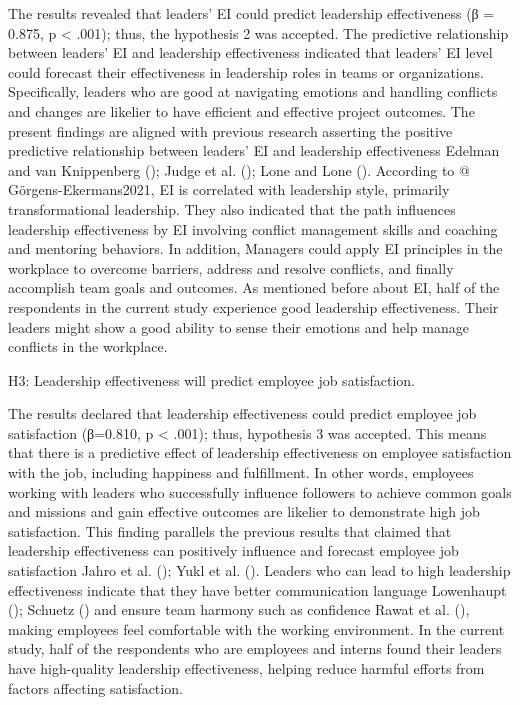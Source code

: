 \documentclass[
  man,
  longtable,
  nolmodern,
  notxfonts,
  notimes,
  colorlinks=true,linkcolor=blue,citecolor=blue,urlcolor=blue]{apa7}
\begin{document}
The results revealed that leaders' EI could predict leadership
effectiveness (β = 0.875, p \textless{} .001); thus, the hypothesis 2
was accepted. The predictive relationship between leaders' EI and
leadership effectiveness indicated that leaders' EI level could forecast
their effectiveness in leadership roles in teams or organizations.
Specifically, leaders who are good at navigating emotions and handling
conflicts and changes are likelier to have efficient and effective
project outcomes. The present findings are aligned with previous
research asserting the positive predictive relationship between leaders'
EI and leadership effectiveness Edelman and van Knippenberg
(); Judge et al.
(); Lone and Lone
(). According to @ Görgens-Ekermans2021, EI
is correlated with leadership style, primarily transformational
leadership. They also indicated that the path influences leadership
effectiveness by EI involving conflict management skills and coaching
and mentoring behaviors. In addition, Managers could apply EI principles
in the workplace to overcome barriers, address and resolve conflicts,
and finally accomplish team goals and outcomes. As mentioned before
about EI, half of the respondents in the current study experience good
leadership effectiveness. Their leaders might show a good ability to
sense their emotions and help manage conflicts in the workplace.

H3: Leadership effectiveness will predict employee job satisfaction.

The results declared that leadership effectiveness could predict
employee job satisfaction (β=0.810, p \textless{} .001); thus,
hypothesis 3 was accepted. This means that there is a predictive effect
of leadership effectiveness on employee satisfaction with the job,
including happiness and fulfillment. In other words, employees working
with leaders who successfully influence followers to achieve common
goals and missions and gain effective outcomes are likelier to
demonstrate high job satisfaction. This finding parallels the previous
results that claimed that leadership effectiveness can positively
influence and forecast employee job satisfaction Jahro et al.
(); Yukl et al.
(). Leaders who can lead to high leadership
effectiveness indicate that they have better communication language
Lowenhaupt (); Schuetz
() and ensure team harmony such as
confidence Rawat et al. (), making
employees feel comfortable with the working environment. In the current
study, half of the respondents who are employees and interns found their
leaders have high-quality leadership effectiveness, helping reduce
harmful efforts from factors affecting satisfaction.
\end{document}
